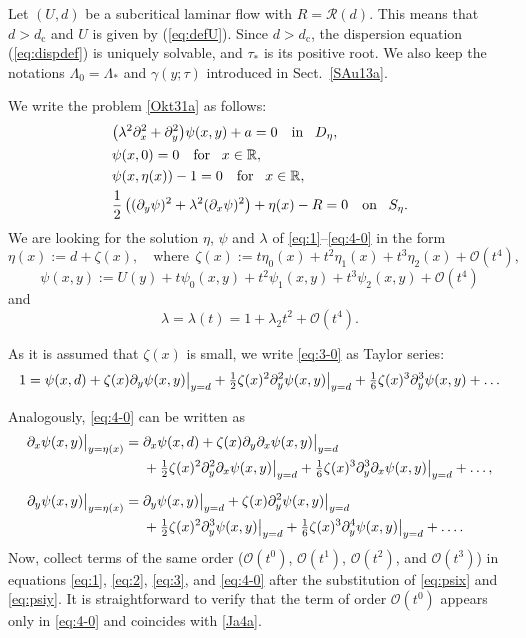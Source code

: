 \documentclass[oneside,a4paper,11pt]{article}
\theoremstyle{thmstyletwo}%
\theoremstyle{thmstylethree}%
\numberwithin{equation}{section}
\newcommand{\pd}[2][]{
\if\relax#1\relax
 \partial_{#2}%
\else
 \partial_{#2}^{#1}%
\fi}
\def\gamm{\gamma}
\def\dcrit{d_{\textrm{c}}}
\def\taust{\tau_{*}}
\def\Obig{\mathcal{O}}
\begin{document}
Let $(U,d)$ be a subcritical laminar flow with $R=\mathcal{R}(d)$. This means that $d>\dcrit$ and $U$ is given by (\ref{eq:defU}). Since $d>\dcrit$, the dispersion equation (\ref{eq:dispdef}) is uniquely solvable, and $\taust$ is  its positive root. We also keep the notations $\Lambda_0=\Lambda_*$ and $\gamm(y;\tau)$ introduced in Sect.~\ref{SAu13a}.

We write the problem \eqref{Okt31a} as follows:
\begin{align}
&\bigl(\lambda^2 \pd[2]{x}+\pd[2]{y}\bigr)\psi(x,y)+a=0\quad\mbox{in\!}\quad D_\eta,\label{eq:1}\\
&\psi(x,0)=0\quad\mbox{for\!}\quad x\in\mathbb{R},\label{eq:2}\\
&\psi(x,\eta(x))-1=0\quad\mbox{for\!}\quad x\in\mathbb{R},\label{eq:3-0}\\
&\frac12\left((\pd{y}\psi)^2+\lambda^2(\pd{x}\psi)^2\right)+\eta(x)-R=0\quad\mbox{on\!}\quad S_\eta.\label{eq:4-0}
\end{align}
We are looking for the solution $\eta$, $\psi$ and $\lambda$ of \eqref{eq:1}--\eqref{eq:4-0} in the form
\begin{equation}\label{eq:etaexpdef}
\eta(x):=d+\zeta(x),\quad\mbox{where}\ \
\zeta(x):=t \eta_0(x) + t^2 \eta_1(x) + t^3 \eta_2(x)+\Obig(t^4),
\end{equation}
\begin{equation}
\psi(x,y):=U(y)+t \psi_0(x,y)+t^2 \psi_1(x,y)+t^3 \psi_2(x,y)+\Obig(t^4)
\label{eq:psiexpdef0}
\end{equation}
and
\begin{equation*}%
\lambda=\lambda(t)=1+\lambda_2t^2+\Obig(t^4).
\end{equation*}

As it is assumed that $\zeta(x)$ is small, we write \eqref{eq:3-0} as Taylor series:
\begin{equation}
1 = \psi(x,d) + \zeta(x)\pd{y}\psi(x,y)\bigr|_{y=d} + \tfrac12\zeta(x)^2 \pd[2]{y}\psi(x,y)\bigr|_{y=d}
+ \tfrac16\zeta(x)^3 \pd[3]{y}\psi(x,y)+\dots
\label{eq:3}
\end{equation}

Analogously,  \eqref{eq:4-0} can be written as
\begin{align}
\pd{x}\psi(x,y)\bigr|_{y=\eta(x)}={}&
\pd{x}\psi(x,d) + \zeta(x)\pd{y}\pd{x}\psi(x,y)\bigr|_{y=d} \notag\\ &{}+
\tfrac12\zeta(x)^2\pd[2]{y}\pd{x}\psi(x,y)\bigr|_{y=d} +
\tfrac16\zeta(x)^3\pd[3]{y}\pd{x}\psi(x,y)\bigr|_{y=d}+\dots,
\label{eq:psix}\\[2mm]
\pd{y}\psi(x,y)\bigr|_{y=\eta(x)}={}&
\pd{y}\psi(x,y)\bigr|_{y=d} + \zeta(x)\pd[2]{y}\psi(x,y)\bigr|_{y=d} \notag\\ &{}+
\tfrac12\zeta(x)^2\pd[3]{y}\psi(x,y)\bigr|_{y=d} +
\tfrac16\zeta(x)^3\pd[4]{y}\psi(x,y)\bigr|_{y=d}+\dots.
\label{eq:psiy}
\end{align}
Now, collect terms of the same order ($\Obig(t^0)$, $\Obig(t^1)$, $\Obig(t^2)$, and $\Obig(t^3)$) in equations \eqref{eq:1}, \eqref{eq:2}, \eqref{eq:3}, and \eqref{eq:4-0} after the substitution of \eqref{eq:psix} and \eqref{eq:psiy}. It is straightforward to verify that the term of order $\Obig(t^0)$ appears only in \eqref{eq:4-0} and coincides with \eqref{Ja4a}.
\end{document}
